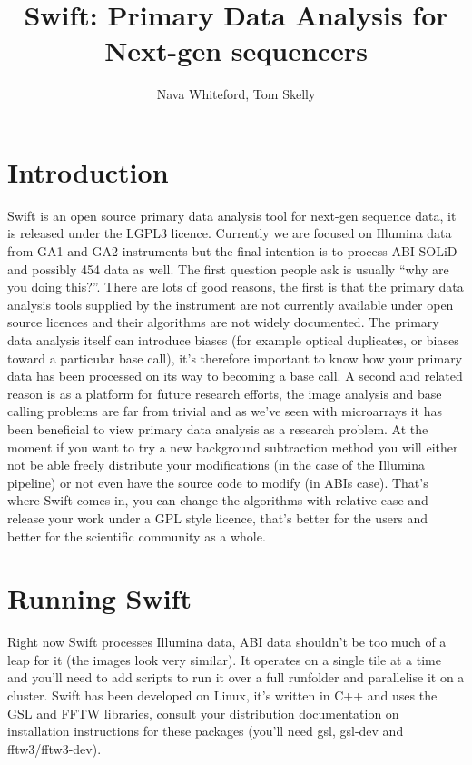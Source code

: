 \documentclass{report}
\title{Swift: Primary Data Analysis for Next-gen sequencers}
\author{Nava Whiteford, Tom Skelly}
\begin{document}
\maketitle
\chapter{Introduction}

Swift is an open source primary data analysis tool for next-gen sequence data, it is released under the LGPL3 licence. Currently we are focused on Illumina data from GA1 and GA2 instruments but the final intention is to process ABI SOLiD and possibly 454 data as well. The first question people ask is usually ``why are you doing this?''. There are lots of good reasons, the first is that the primary data analysis tools supplied by the instrument are not currently available under open source licences and their algorithms are not widely documented. The primary data analysis itself can introduce biases (for example optical duplicates, or biases toward a particular base call), it's therefore important to know how your primary data has been processed on its way to becoming a base call. A second and related reason is as a platform for future research efforts, the image analysis and base calling problems are far from trivial and as we've seen with microarrays it has been beneficial to view primary data analysis as a research problem. At the moment if you want to try a new background subtraction method you will either not be able freely distribute your modifications (in the case of the Illumina pipeline) or not even have the source code to modify (in ABIs case). That's where Swift comes in, you can change the algorithms with relative ease and release your work under a GPL style licence, that's better for the users and better for the scientific community as a whole.

\chapter{Running Swift}

Right now Swift processes Illumina data, ABI data shouldn't be too much of a leap for it (the images look very similar). It operates on a single tile at a time and you'll need to add scripts to run it over a full runfolder and parallelise it on a cluster. Swift has been developed on Linux, it's written in C++ and uses the GSL and FFTW libraries, consult your distribution documentation on installation instructions for these packages (you'll need gsl, gsl-dev and fftw3/fftw3-dev). 
\end{document}
